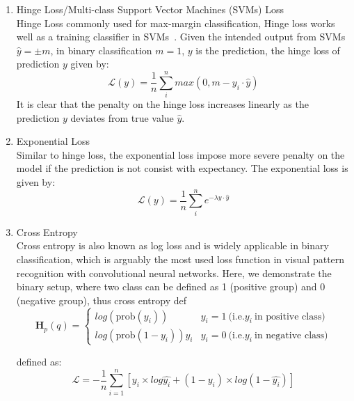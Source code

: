 \begin{enumerate}
    \item Hinge Loss/Multi-class Support Vector Machines (SVMs) Loss \\
Hinge Loss commonly used for max-margin classification, Hinge loss works well as a training classifier in SVMs~\cite{Cortes_1995}. Given the intended output from SVMs $\hat{y} = \pm m$, in binary classification $m = 1$, $y$ is the prediction, the hinge loss of prediction $y$ given by:
\begin {equation}
    \mathcal{L}(y) = \frac {1}{n} \sum_i^n max(0,m - y_i \cdot \hat{y})
\end{equation}
It is clear that the penalty on the hinge loss increases linearly as the prediction $y$ deviates from true value $\hat{y}$.
    \item Exponential Loss \\
Similar to hinge loss, the exponential loss impose more severe penalty on the model if the prediction is not consist with expectancy. The exponential loss is given by:
\begin {equation}
    \mathcal{L}(y) = \frac {1}{n} \sum_i^n e^{-\lambda y \cdot \hat{y}}
\end{equation}
    \item Cross Entropy \\
Cross entropy is also known as log loss and is widely applicable in binary classification, which is arguably the most used loss function in visual pattern recognition with convolutional neural networks. Here, we demonstrate the binary setup, where two class can be defined as 1 (positive group) and 0 (negative group), thus cross entropy def
\begin{equation}
   \mathbf{H}_p(q) = \left\{ 
    \begin{array}{lr}
        log(\mathrm{prob}(y_i)) & y_i = 1~\text{(i.e.} y_i~\text{in positive class)}  \\
        log(\mathrm{prob}(1-y_i))y_i & y_i = 0 ~\text{(i.e.} y_i~\text{in negative class)}  
    \end{array}\right.
\end{equation}

defined as:
\begin{equation}
    \mathcal{L} = -\frac{1}{n}\sum_{i=1}^n [y_i \times log\hat{y_i} +(1-y_i) \times log(1-\hat{y_i}) ] 
\end{equation}


\end{enumerate}
